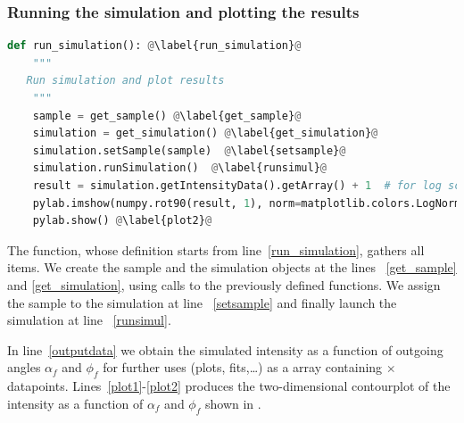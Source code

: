 


%
\subsubsection{Running the simulation  and
  plotting the results}

\begin{lstlisting}[language=python, style=eclipseboxed,name=ex1,nolol]
def run_simulation(): @\label{run_simulation}@
    """
   Run simulation and plot results
    """
    sample = get_sample() @\label{get_sample}@
    simulation = get_simulation() @\label{get_simulation}@
    simulation.setSample(sample)  @\label{setsample}@
    simulation.runSimulation()  @\label{runsimul}@
    result = simulation.getIntensityData().getArray() + 1  # for log scale  @\label{outputdata}@
    pylab.imshow(numpy.rot90(result, 1), norm=matplotlib.colors.LogNorm(), extent=[-1.0, 1.0, 0, 2.0]) @\label{plot1}@
    pylab.show() @\label{plot2}@
\end{lstlisting}
The function, whose definition starts from line~\ref{run_simulation}, gathers all
items. We create the sample and the simulation objects at the lines 
~\ref{get_sample} and \ref{get_simulation}, using calls to the previously defined functions. We assign the sample to the simulation at line ~\ref{setsample} and
finally launch the simulation at line ~\ref{runsimul}.

In line~\ref{outputdata} we obtain the simulated intensity
as a function of outgoing angles $\alpha_f$ and $\phi_f$ for further
uses (plots, fits,\ldots) as a  array containing
$\times$
datapoints. Lines~\ref{plot1}-\ref{plot2} produces the two-dimensional
contourplot of the intensity as a function of $\alpha_f$ and
$\phi_f$ shown in . 

